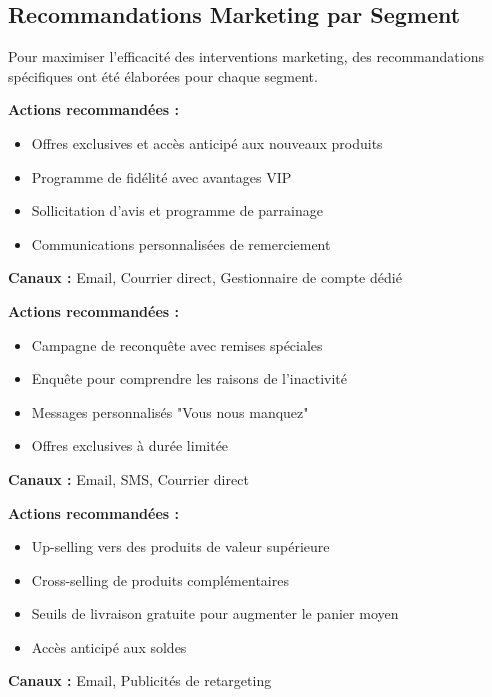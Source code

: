\documentclass[12pt,a4paper]{article}
\begin{document}
\subsection{Recommandations Marketing par Segment}

Pour maximiser l'efficacité des interventions marketing, des recommandations spécifiques ont été élaborées pour chaque segment.

\begin{tcolorbox}[title=Segment Champions (Priorité : HAUTE VALEUR), colback=white, colframe=black]
\textbf{Actions recommandées :}
\begin{itemize}
    \item Offres exclusives et accès anticipé aux nouveaux produits
    \item Programme de fidélité avec avantages VIP
    \item Sollicitation d'avis et programme de parrainage
    \item Communications personnalisées de remerciement
\end{itemize}
\textbf{Canaux :} Email, Courrier direct, Gestionnaire de compte dédié
\end{tcolorbox}

\begin{tcolorbox}[title=Segment À Risque (Priorité : URGENTE), colback=white, colframe=black]
\textbf{Actions recommandées :}
\begin{itemize}
    \item Campagne de reconquête avec remises spéciales
    \item Enquête pour comprendre les raisons de l'inactivité
    \item Messages personnalisés "Vous nous manquez"
    \item Offres exclusives à durée limitée
\end{itemize}
\textbf{Canaux :} Email, SMS, Courrier direct
\end{tcolorbox}

\begin{tcolorbox}[title=Segment Clients Actifs (Priorité : MOYENNE), colback=white, colframe=black]
\textbf{Actions recommandées :}
\begin{itemize}
    \item Up-selling vers des produits de valeur supérieure
    \item Cross-selling de produits complémentaires
    \item Seuils de livraison gratuite pour augmenter le panier moyen
    \item Accès anticipé aux soldes
\end{itemize}
\textbf{Canaux :} Email, Publicités de retargeting
\end{tcolorbox}
\end{document}
